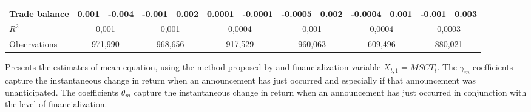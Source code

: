 \begin{landscape}
\begin{table}[]
{\begin{tabular}{lllllllllllll}
Trade balance            & 0.001     & -0.004    & -0.001    & 0.002     & 0.0001   & -0.0001   & -0.0005   & 0.002     & -0.0004   & 0.001     & -0.001   & 0.003   \\ \hline
$R^2$ &
  \multicolumn{2}{c}{0,001} &
  \multicolumn{2}{c}{0,001} &
  \multicolumn{2}{c}{0,0004} &
  \multicolumn{2}{c}{0,001} &
  \multicolumn{2}{c}{0,0004} &
  \multicolumn{2}{c}{0,0003} \\
Observations &
  \multicolumn{2}{c}{971,990} &
  \multicolumn{2}{c}{968,656} &
  \multicolumn{2}{c}{917,529} &
  \multicolumn{2}{c}{960,063} &
  \multicolumn{2}{c}{609,496} &
  \multicolumn{2}{c}{880,021} \\ \hline
\end{tabular}%
}
\singlespacing
        \footnotesize
 Presents the estimates of mean equation, using the method proposed by \citep{kurov2019price} and financialization variable $X_{t,1}=MSCT_t$. The $\gamma_m$ coefficients capture the instantaneous change in return when an announcement has just occurred and especially if that announcement was unanticipated. The coefficients $\theta_m$ capture the instantaneous change in return when an announcement has just occurred in conjunction with the level of financialization.
\end{table}
\end{landscape}

